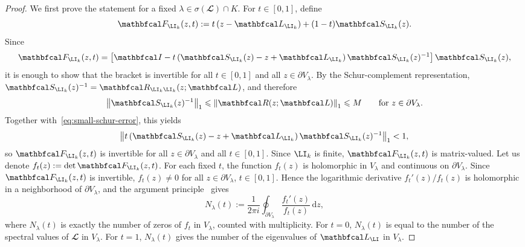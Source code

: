 \documentclass{SciPost}
\begin{document}
\begin{proof}
    We first prove the statement for a fixed \(\lambda \in \sigma(\mathbfcal L)\cap K\). For \(t \in [0,1]\), define
    \begin{equation}
        \mathbfcal F_{\LI_k}(z,t)
        :=
        t\left(z-\mathbfcal L_{\LI_k}\right)
        +
        (1-t)\mathbfcal S_{\LI_k}(z).
    \end{equation}
    Since
    \begin{equation}
        \mathbfcal F_{\LI_k}(z,t)
        =
        \left[
            \mathbfcal I
            -
            t\left(
                \mathbfcal S_{\LI_k}(z)-z+\mathbfcal L_{\LI_k}
            \right)
            \mathbfcal S_{\LI_k}(z)^{-1}
        \right]
    \mathbfcal S_{\LI_k}(z),
    \end{equation}
    it is enough to show that the bracket is invertible for all $t\in[0, 1]$ and all $z \in \partial V_\lambda$. By the Schur-complement representation,
        $\mathbfcal S_{\LI_k}(z)^{-1}
        =
        \mathbfcal R_{\LI_k \LI_k}(z;\mathbfcal L)
        $,
    and therefore
    \begin{equation}
        \left \|
        \mathbfcal S_{\LI_k}(z)^{-1}
        \right \|_1
        \leqslant
        \left \|
        \mathbfcal R(z;\mathbfcal L)
        \right \|_1
        \leqslant
        M
        \qquad
        \text{for } z \in \partial V_\lambda.
    \end{equation}
    Together with~\eqref{eq:small-schur-error}, this yields
    \begin{equation}
        \left \|
        t\left(
            \mathbfcal S_{\LI_k}(z)-z+\mathbfcal L_{\LI_k}
        \right)
        \mathbfcal S_{\LI_k}(z)^{-1}
        \right \|_1
        < 1,
    \end{equation}
    so \(\mathbfcal F_{\LI_k}(z,t)\) is invertible for all \(z \in \partial V_\lambda\) and all \(t \in [0,1]\).
    Since \(\LI_k\) is finite, \(\mathbfcal F_{\LI_k}(z,t)\) is matrix-valued.      Let us denote
    $f_t(z) := \det \mathbfcal F_{\LI_k}(z,t)$.
    For each fixed \(t\), the function \(f_t(z)\) is holomorphic in \(V_\lambda\) and continuous on \(\partial V_\lambda\). Since $\mathbfcal F_{\LI_k}(z, t)$ is invertible,
    $f_t(z) \neq 0$
    for all  $z \in \partial V_\lambda$, $t \in [0,1]$.
    Hence the logarithmic derivative \(f_t'(z)/f_t(z)\) is holomorphic in a neighborhood of \(\partial V_\lambda\), and the argument principle~\cite{Ablowitz2003} gives
    \begin{equation}
        N_\lambda(t)
        :=
        \frac{1}{2\pi i}
        \oint_{\partial V_\lambda}
        \frac{f_t'(z)}{f_t(z)}\,\mathrm dz,
        \label{eq:Nt-argument-principle}
    \end{equation}
    where \(N_\lambda(t)\) is exactly the number of zeros of \(f_t\) in \(V_\lambda\), counted with multiplicity. For \(t=0\), $N_\lambda(t)$ is equal to the number of the spectral values of \(\mathbfcal L\) in \(V_\lambda\). For \(t=1\), $N_\lambda(t)$ gives the number of the eigenvalues of \(\mathbfcal L_\LI\) in \(V_\lambda\).


\end{proof}
\end{document}
